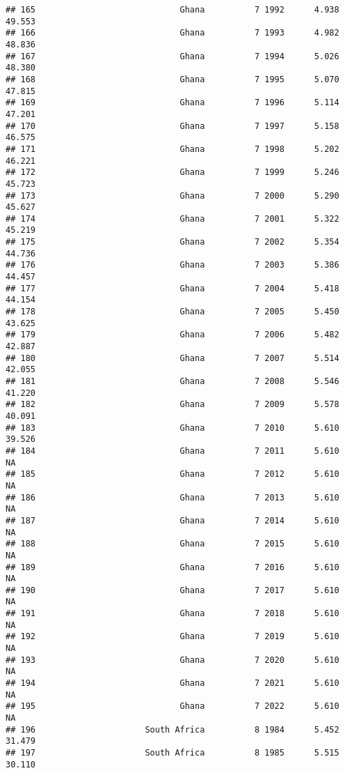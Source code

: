 \documentclass[
]{article}
\begin{document}
\begin{verbatim}
## 165                             Ghana          7 1992      4.938     49.553
## 166                             Ghana          7 1993      4.982     48.836
## 167                             Ghana          7 1994      5.026     48.380
## 168                             Ghana          7 1995      5.070     47.815
## 169                             Ghana          7 1996      5.114     47.201
## 170                             Ghana          7 1997      5.158     46.575
## 171                             Ghana          7 1998      5.202     46.221
## 172                             Ghana          7 1999      5.246     45.723
## 173                             Ghana          7 2000      5.290     45.627
## 174                             Ghana          7 2001      5.322     45.219
## 175                             Ghana          7 2002      5.354     44.736
## 176                             Ghana          7 2003      5.386     44.457
## 177                             Ghana          7 2004      5.418     44.154
## 178                             Ghana          7 2005      5.450     43.625
## 179                             Ghana          7 2006      5.482     42.887
## 180                             Ghana          7 2007      5.514     42.055
## 181                             Ghana          7 2008      5.546     41.220
## 182                             Ghana          7 2009      5.578     40.091
## 183                             Ghana          7 2010      5.610     39.526
## 184                             Ghana          7 2011      5.610         NA
## 185                             Ghana          7 2012      5.610         NA
## 186                             Ghana          7 2013      5.610         NA
## 187                             Ghana          7 2014      5.610         NA
## 188                             Ghana          7 2015      5.610         NA
## 189                             Ghana          7 2016      5.610         NA
## 190                             Ghana          7 2017      5.610         NA
## 191                             Ghana          7 2018      5.610         NA
## 192                             Ghana          7 2019      5.610         NA
## 193                             Ghana          7 2020      5.610         NA
## 194                             Ghana          7 2021      5.610         NA
## 195                             Ghana          7 2022      5.610         NA
## 196                      South Africa          8 1984      5.452     31.479
## 197                      South Africa          8 1985      5.515     30.110

\end{verbatim}
\end{document}
